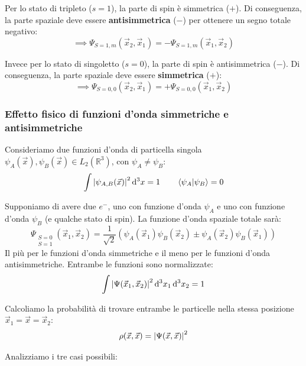 Per lo stato di tripleto (\(s=1\)), la parte di spin è simmetrica ($+$). Di conseguenza, la parte spaziale deve essere \textbf{antisimmetrica} ($-$) per ottenere un segno totale negativo:
\[
    \implies \Psi_{S=1, m}(\vec{x}_2, \vec{x}_1) = - \Psi_{S=1, m}(\vec{x}_1, \vec{x}_2)
\]

Invece per lo stato di singoletto (\(s=0\)), la parte di spin è antisimmetrica ($-$). Di conseguenza, la parte spaziale deve essere \textbf{simmetrica} ($+$):
\[
    \implies \Psi_{S=0, 0}(\vec{x}_2, \vec{x}_1) = + \Psi_{S=0, 0}(\vec{x}_1, \vec{x}_2)
\]

\subsubsection{Effetto fisico di funzioni d'onda simmetriche e antisimmetriche}

Consideriamo due funzioni d'onda di particella singola \(\psi_A(\vec{x}), \psi_B(\vec{x}) \in L_2(\mathbb{R}^3)\), con \(\psi_A \neq \psi_B\):
\begin{equation}
    \int \abs{\psi_{A,B}(\vec{x})}^2 \dd[3]{x} = 1 \qquad \braket{\psi_A}{\psi_B} = 0
\end{equation}

Supponiamo di avere due \(e^-\), uno con funzione d'onda \(\psi_A\) e uno con funzione d'onda \(\psi_B\) (e qualche stato di spin). 
La funzione d'onda spaziale totale sarà:
\begin{equation}
    \Psi_{\substack{S=0 \\ S=1}} (\vec{x}_1, \vec{x}_2) = \frac{1}{\sqrt{2}} \left( \psi_A(\vec{x}_1) \psi_B(\vec{x}_2) \pm \psi_A(\vec{x}_2) \psi_B(\vec{x}_1) \right)
\end{equation}
Il più per le funzioni d'onda simmetriche e il meno per le funzioni d'onda antisimmetriche. Entrambe le funzioni sono normalizzate:
\[
    \int \abs{\Psi(\vec{x}_1, \vec{x}_2)}^2 \dd[3]{x_1} \dd[3]{x_2} = 1
\]

Calcoliamo la probabilità di trovare entrambe le particelle nella stessa posizione \(\vec{x}_1 = \vec{x} = \vec{x}_2\):
\begin{equation}
    \rho(\vec{x}, \vec{x}) = \abs{\Psi(\vec{x}, \vec{x})}^2
\end{equation}

Analizziamo i tre casi possibili:

